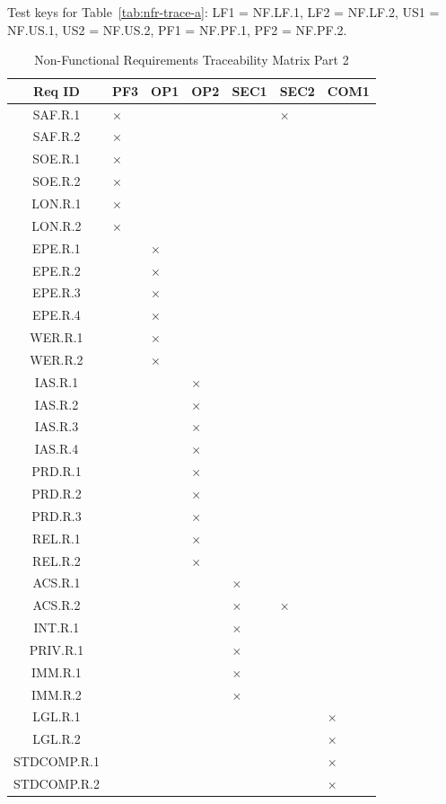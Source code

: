 \documentclass[12pt, titlepage]{article}
\begin{document}
\noindent
Test keys for Table~\ref{tab:nfr-trace-a}:
LF1 = NF.LF.1, LF2 = NF.LF.2, US1 = NF.US.1,
US2 = NF.US.2, PF1 = NF.PF.1, PF2 = NF.PF.2.

\begin{table}[H]
\centering
\small
\caption{Non-Functional Requirements Traceability Matrix Part 2}
\label{tab:nfr-trace-b}
\begin{tabularx}{\textwidth}{|c|*{6}{>{\centering\arraybackslash}X|}}
\hline
Req ID & PF3 & OP1 & OP2 & SEC1 & SEC2 & COM1 \\
\hline
SAF.R.1 & $\times$ & & & & $\times$ & \\
\hline
SAF.R.2 & $\times$ & & & & & \\
\hline
SOE.R.1 & $\times$ & & & & & \\
\hline
SOE.R.2 & $\times$ & & & & & \\
\hline
LON.R.1 & $\times$ & & & & & \\
\hline
LON.R.2 & $\times$ & & & & & \\
\hline
EPE.R.1 & & $\times$ & & & & \\
\hline
EPE.R.2 & & $\times$ & & & & \\
\hline
EPE.R.3 & & $\times$ & & & & \\
\hline
EPE.R.4 & & $\times$ & & & & \\
\hline
WER.R.1 & & $\times$ & & & & \\
\hline
WER.R.2 & & $\times$ & & & & \\
\hline
IAS.R.1 & & & $\times$ & & & \\
\hline
IAS.R.2 & & & $\times$ & & & \\
\hline
IAS.R.3 & & & $\times$ & & & \\
\hline
IAS.R.4 & & & $\times$ & & & \\
\hline
PRD.R.1 & & & $\times$ & & & \\
\hline
PRD.R.2 & & & $\times$ & & & \\
\hline
PRD.R.3 & & & $\times$ & & & \\
\hline
REL.R.1 & & & $\times$ & & & \\
\hline
REL.R.2 & & & $\times$ & & & \\
\hline
ACS.R.1 & & & & $\times$ & & \\
\hline
ACS.R.2 & & & & $\times$ & $\times$ & \\
\hline
INT.R.1 & & & & $\times$ & & \\
\hline
PRIV.R.1 & & & & $\times$ & & \\
\hline
IMM.R.1 & & & & $\times$ & & \\
\hline
IMM.R.2 & & & & $\times$ & & \\
\hline
LGL.R.1 & & & & & & $\times$ \\
\hline
LGL.R.2 & & & & & & $\times$ \\
\hline
STDCOMP.R.1 & & & & & & $\times$ \\
\hline
STDCOMP.R.2 & & & & & & $\times$ \\
\hline
\end{tabularx}
\end{table}
\FloatBarrier
\end{document}
